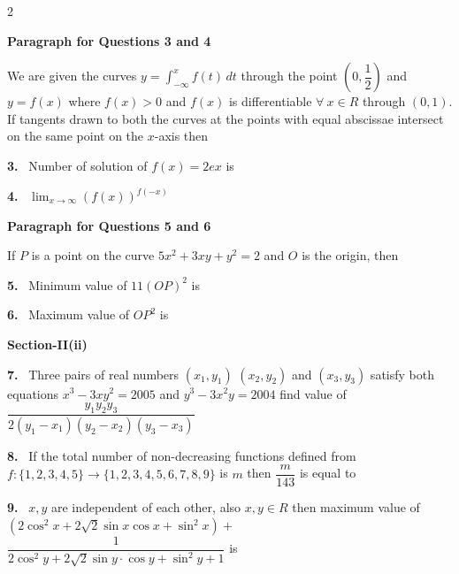 \documentclass[10pt]{extarticle}
\newcommand{\sect}[1]{\par\smallskip\noindent\textbf{#1}\par}
\newcommand{\qn}[1]{\par\smallskip\noindent\textbf{#1.}~}
\newcommand{\paraq}[2]{\par\smallskip\noindent\textbf{Paragraph for Questions #1 and #2}\par}
\begin{document}
\begin{multicols}{2}
\paraq{3}{4}
We are given the curves $y=\displaystyle\int_{-\infty}^{x}f(t)\,dt$ through the point $\left(0,\dfrac12\right)$ and $y=f(x)$ where $f(x)>0$ and $f(x)$ is differentiable $\forall\ x\in R$ through $(0,1)$. If tangents drawn to both the curves at the points with equal abscissae intersect on the same point on the $x$-axis then

\qn{3} Number of solution of $f(x)=2ex$ is \underline{\hspace{3em}}

\qn{4} $\displaystyle\lim_{x\to\infty}(f(x))^{f(-x)}$ \underline{\hspace{3em}}

\paraq{5}{6}
If $P$ is a point on the curve $5x^2+3xy+y^2=2$ and $O$ is the origin, then

\qn{5} Minimum value of $11(OP)^2$ is

\qn{6} Maximum value of $OP^2$ is

\sect{Section-II(ii)}

\qn{7} Three pairs of real numbers $(x_1,y_1)$ $(x_2,y_2)$ and $(x_3,y_3)$ satisfy both equations $x^3-3xy^2=2005$ and $y^3-3x^2y=2004$ find value of $\dfrac{y_1y_2y_3}{2(y_1-x_1)(y_2-x_2)(y_3-x_3)}$

\qn{8} If the total number of non-decreasing functions defined from $f:\{1,2,3,4,5\}\longrightarrow\{1,2,3,4,5,6,7,8,9\}$ is $m$ then $\dfrac m{143}$ is equal to

\qn{9} $x,y$ are independent of each other, also $x,y\in R$ then maximum value of\\
$\left(2\cos^2x+2\sqrt2\sin x\cos x+\sin^2x\right)+$\\
$\dfrac1{2\cos^2y+2\sqrt2\sin y\cdot\cos y+\sin^2y+1}$ is


\end{multicols}
\end{document}

